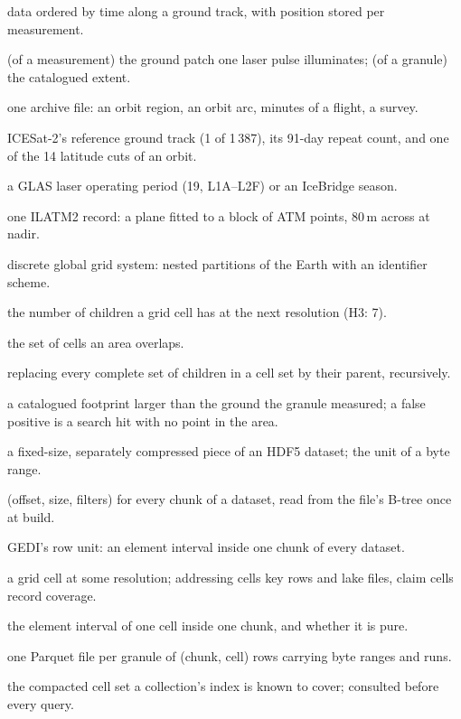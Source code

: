 \documentclass[10pt,a4paper]{article}
\begin{document}
\begin{description}\setlength{\itemsep}{1pt}
\item[along-track] data ordered by time along a ground track, with position stored per measurement.
\item[footprint] (of a measurement) the ground patch one laser pulse illuminates; (of a granule) the catalogued extent.
\item[granule] one archive file: an orbit region, an orbit arc, minutes of a flight, a survey.
\item[RGT, cycle, region] ICESat-2's reference ground track (1 of 1\,387), its 91-day repeat count, and one of the 14 latitude cuts of an orbit.
\item[campaign] a GLAS laser operating period (19, L1A--L2F) or an IceBridge season.
\item[platelet] one ILATM2 record: a plane fitted to a block of ATM points, 80\,m across at nadir.
\item[DGGS] discrete global grid system: nested partitions of the Earth with an identifier scheme.
\item[aperture] the number of children a grid cell has at the next resolution (H3: 7).
\item[polyfill] the set of cells an area overlaps.
\item[compaction] replacing every complete set of children in a cell set by their parent, recursively.
\item[over-claim] a catalogued footprint larger than the ground the granule measured; a false positive is a search hit with no point in the area.
\item[chunk] a fixed-size, separately compressed piece of an HDF5 dataset; the unit of a byte range.
\item[chunk map] (offset, size, filters) for every chunk of a dataset, read from the file's B-tree once at build.
\item[span] GEDI's row unit: an element interval inside one chunk of every dataset.
\item[cell] a grid cell at some resolution; addressing cells key rows and lake files, claim cells record coverage.
\item[run] the element interval of one cell inside one chunk, and whether it is pure.
\item[index] one Parquet file per granule of (chunk, cell) rows carrying byte ranges and runs.
\item[claim] the compacted cell set a collection's index is known to cover; consulted before every query.

\end{description}
\end{document}
